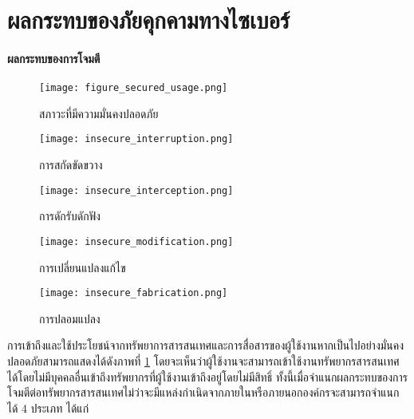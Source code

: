 \documentclass[../th_cyber_warfare_distilled.tex]{subfiles}
\begin{document}
\section{ผลกระทบของภัยคุกคามทางไซเบอร์}

\paragraph{ผลกระทบของการโจมตี}
\begin{figure}
	\texttt{[image: figure\_secured\_usage.png]}
	\centering
	\caption{สภาวะที่มีความมั่นคงปลอดภัย}
	\label{figure:secured_usage}
\end{figure}

\begin{figure}
	\texttt{[image: insecure\_interruption.png]}
	\centering
	\caption{การสกัดขัดขวาง}
	\label{figure:insecure_interruption}
\end{figure}

\begin{figure}
	\texttt{[image: insecure\_interception.png]}
	\centering
	\caption{การดักรับดักฟัง}
	\label{figure:insecure_interception}
\end{figure}

\begin{figure}
	\texttt{[image: insecure\_modification.png]}
	\centering
	\caption{การเปลี่ยนแปลงแก้ไข}
	\label{figure:insecure_modification}
\end{figure}

\begin{figure}
	\texttt{[image: insecure\_fabrication.png]}
	\centering
	\caption{การปลอมแปลง}
	\label{figure:insecure_fabrication}
\end{figure}

การเข้าถึงและใช้ประโยชน์จากทรัพยาการสารสนเทศและการสื่อสารของผู้ใช้งานหากเป็นไปอย่างมั่นคงปลอดภัยสามารถแสดงได้ดังภาพที่ \ref{figure:secured_usage} โดยจะเห็นว่าผู้ใช้งานจะสามารถเข้าใช้งานทรัพยากรสารสนเทศได้โดยไม่มีบุคคลอื่นเข้าถึงทรัพยากรที่ผู้ใช้งานเข้าถึงอยู่โดยไม่มีสิทธิ์ ทั้งนี้เมื่อจำแนกผลกระทบของการโจมตีต่อทรัพยากรสารสนเทศไม่ว่าจะมีแหล่งกำเนิดจากภายในหรือภายนอกองค์กรจะสามารถจำแนกได้ 4 ประเภท ได้แก่
\end{document}
